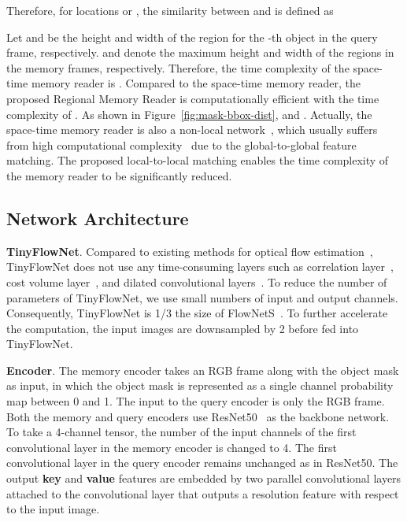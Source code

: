 \documentclass[final]{cvpr}
\begin{document}
Therefore, for locations  or , the similarity between  and  is defined as



Let  and  be the height and width of the region for the -th object in the query frame, respectively.
 and  denote the maximum height and width of the regions in the memory frames, respectively.
Therefore, the time complexity of the space-time memory reader is .
Compared to the space-time memory reader, the proposed Regional Memory Reader is computationally efficient with the time complexity of .
As shown in Figure~\ref{fig:mask-bbox-dist},  and .
Actually, the space-time memory reader is also a non-local network~\cite{DBLP:conf/cvpr/0004GGH18}, which usually suffers from high computational complexity~\cite{DBLP:conf/iccv/ZhuXBHB19} due to the global-to-global feature matching.
The proposed local-to-local matching enables the time complexity of the memory reader to be significantly reduced.

\subsection{Network Architecture}

\noindent \textbf{TinyFlowNet}.
Compared to existing methods for optical flow estimation~\cite{DBLP:conf/iccv/DosovitskiyFIHH15,DBLP:conf/cvpr/SchusterWUS19,DBLP:conf/cvpr/SunY0K18,DBLP:conf/cvpr/XuRK17}, TinyFlowNet does not use any time-consuming layers such as correlation layer~\cite{DBLP:conf/iccv/DosovitskiyFIHH15}, cost volume layer~\cite{DBLP:conf/cvpr/SunY0K18,DBLP:conf/cvpr/XuRK17}, and dilated convolutional layers~\cite{DBLP:conf/cvpr/SchusterWUS19}.
To reduce the number of parameters of TinyFlowNet, we use small numbers of input and output channels.
Consequently, TinyFlowNet is 1/3 the size of FlowNetS~\cite{DBLP:conf/cvpr/IlgMSKDB17}.
To further accelerate the computation, the input images are downsampled by 2 before fed into TinyFlowNet.

\noindent \textbf{Encoder}.
The memory encoder takes an RGB frame along with the object mask as input, in which the object mask is represented as a single channel probability map between 0 and 1.
The input to the query encoder is only the RGB frame.
Both the memory and query encoders use ResNet50~\cite{DBLP:conf/cvpr/HeZRS16} as the backbone network.
To take a 4-channel tensor, the number of the input channels of the first convolutional layer in the memory encoder is changed to 4.
The first convolutional layer in the query encoder remains unchanged as in ResNet50.
The output \textbf{key} and \textbf{value} features are embedded by two parallel convolutional layers attached to the convolutional layer that outputs a  resolution feature with respect to the input image.
\end{document}
